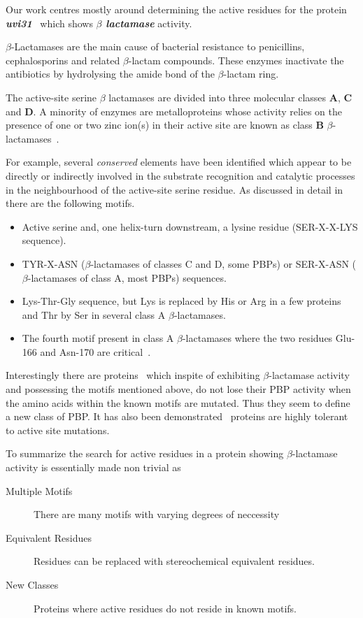 
Our work centres mostly around determining the active residues for the protein {\bf\em uvi31}~\cite{OUR} which shows  {\bf\em $\beta$ lactamase} activity.

$\beta$-Lactamases are the main cause of bacterial resistance to penicillins, 
cephalosporins and related $\beta$-lactam compounds. 
These enzymes inactivate the antibiotics by hydrolysing the amide bond of the $\beta$-lactam ring. 

The active-site serine $\beta$ lactamases are divided into three molecular classes {\bf A}, {\bf C} and {\bf D}. 
A minority of enzymes are metalloproteins whose activity relies on the presence of one or two zinc ion(s) 
in their active site are known as class {\bf B} $\beta$-lactamases~\cite{BLACCLASSIFICATION}.

For example,  several {\em conserved} elements have been identiﬁed which appear to be directly or indirectly involved in the substrate recognition and catalytic processes in the neighbourhood of the active-site serine residue. As discussed in detail in~\cite{BLACCLASSIFICATION2} there are the following motifs. 
\begin{itemize}
    \item Active serine and, one helix-turn downstream, a lysine residue (SER-X-X-LYS sequence). 
	\item TYR-X-ASN ($\beta$-lactamases of classes C and D, some PBPs) or SER-X-ASN ($\beta$-lactamases of class A, most PBPs) sequences.
    \item Lys-Thr-Gly sequence, but Lys is replaced by His or Arg in a few proteins~\cite{1G68} and Thr by Ser in several class A $\beta$-lactamases.
	\item The fourth motif present in class A $\beta$-lactamases where the two residues Glu-166 and Asn-170 are critical~\cite{MUTATE1}.
\end{itemize}
	 
Interestingly there are proteins~\cite{1O75} which inspite of exhibiting $\beta$-lactamase activity and possessing the motifs mentioned above, do not lose
their PBP activity when the amino acids within the known motifs are mutated. Thus they seem to define a new class of PBP.
It has also been demonstrated~\cite{HIGHTOLERANCE} proteins are highly tolerant to active site mutations.


To summarize the search for active residues in a protein showing $\beta$-lactamase activity is essentially made non trivial as 
\begin{description}
   \item[Multiple Motifs] There are many motifs with varying degrees of neccessity
   \item[Equivalent Residues] Residues can be replaced with stereochemical \mbox equivalent residues.
   \item[New Classes] Proteins where active residues do not reside in known motifs.
\end{description}


